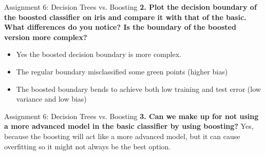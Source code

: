 \documentclass[10pt]{beamer}
\begin{document}
\begin{frame}{Assignment 6: Decision Trees vs. Boosting}
\textbf{2. Plot the decision boundary of the boosted classifier on iris and
compare it with that of the basic. What differences do you notice?
Is the boundary of the boosted version more complex?} 
\begin{itemize}
    \item Yes the boosted decision boundary is more complex.
    \item The regular boundary misclassified some green points (higher bias)
    \item The boosted boundary bends to achieve both low training and test error (low variance and low bias)
\end{itemize}
\end{frame}

\begin{frame}{Assignment 6: Decision Trees vs. Boosting}
\textbf{3. Can we make up for not using a more advanced model in the basic
classifier by using boosting?}
Yes, because the boosting will act like a more advanced model, but it can cause
overfitting so it might not always be the best option.
\end{frame}
\end{document}

